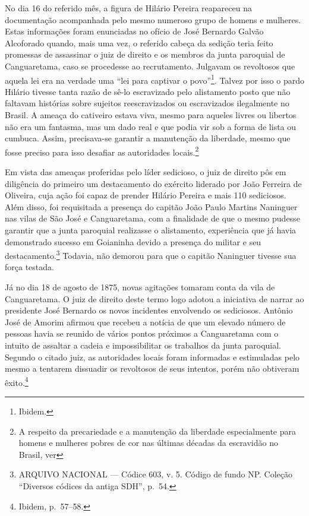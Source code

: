 \begin{refsection}

No dia 16 do referido mês, a figura de Hilário Pereira reapareceu na documentação acompanhada pelo mesmo numeroso grupo de homens e mulheres. Estas informações foram enunciadas no ofício de José Bernardo Galvão Alcoforado quando, mais uma vez, o referido cabeça da sedição teria feito promessas de assassinar o juiz de direito e os membros da junta paroquial de Canguaretama, caso se procedesse ao recrutamento. Julgavam os revoltosos que aquela lei era na verdade uma “lei para captivar o povo”\footnote{Ibidem.}. Talvez por isso o pardo Hilário tivesse tanta razão de sê-lo escravizado pelo alistamento posto que não faltavam histórias sobre sujeitos reescravizados ou escravizados ilegalmente no Brasil. A ameaça do cativeiro estava viva, mesmo para aqueles livres ou libertos não era um fantasma, mas um dado real e que podia vir sob a forma de lista ou cumbuca. Assim, precisava-se garantir a manutenção da liberdade, mesmo que fosse preciso para isso desafiar as autoridades locais.\footnote{A respeito da precariedade e a manutenção da liberdade especialmente para homens e mulheres pobres de cor nas últimas décadas da escravidão no Brasil, ver }

Em vista das ameaças proferidas pelo líder sedicioso, o juiz de direito pôs em diligência do primeiro um destacamento do exército liderado por João Ferreira de Oliveira, cuja ação foi capaz de prender Hilário Pereira e mais 110 sediciosos. Além disso, foi requisitada a presença do capitão João Paulo Martins Naninguer nas vilas de São José e Canguaretama, com a finalidade de que o mesmo pudesse garantir que a junta paroquial realizasse o alistamento, experiência que já havia demonstrado sucesso em Goianinha devido a presença do militar e seu destacamento.\footnote{ARQUIVO NACIONAL --- Códice 603, v. 5. Código de fundo NP. Coleção “Diversos códices da antiga SDH”, p.~54.} Todavia, não demorou para que o capitão Naninguer tivesse sua força testada.

Já no dia 18 de agosto de 1875, novas agitações tomaram conta da vila de Canguaretama. O juiz de direito deste termo logo adotou a iniciativa de narrar ao presidente José Bernardo os novos incidentes envolvendo os sediciosos. Antônio José de Amorim afirmou que recebeu a notícia de que um elevado número de pessoas havia se reunido de vários pontos próximos a Canguaretama com o intuito de assaltar a cadeia e impossibilitar os trabalhos da junta paroquial. Segundo o citado juiz, as autoridades locais foram informadas e estimuladas pelo mesmo a tentarem dissuadir os revoltosos de seus intentos, porém não obtiveram êxito.\footnote{Ibidem, p.~57--58.}


\end{refsection}

